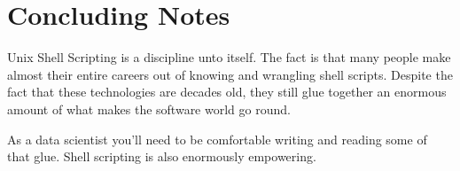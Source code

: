 \documentclass[11pt]{article}
\begin{document}
\section{Concluding Notes}
\label{sec:org5576b9e}

Unix Shell Scripting is a discipline unto itself. The fact is that
many people make almost their entire careers out of knowing and
wrangling shell scripts. Despite the fact that these technologies are
decades old, they still glue together an enormous amount of what makes
the software world go round. 

As a data scientist you'll need to be comfortable writing and reading
some of that glue. Shell scripting is also enormously empowering.
\end{document}
